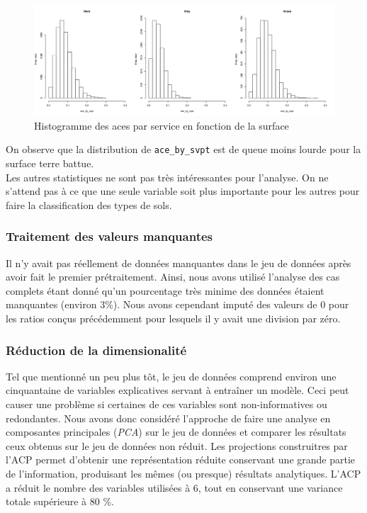 \begin{figure}[H]
	\caption{Histogramme des aces par service en fonction de la surface}
	\label{fig:acebyshist}
	\includegraphics[width=\textwidth]{acebysurfacehist}
\end{figure}

On observe que la distribution de \texttt{ace\_by\_svpt} est de queue moins lourde pour la surface terre battue.\\

Les autres statistiques ne sont pas très intéressantes pour l'analyse. On ne s'attend pas à ce que une seule variable soit plus importante pour les autres pour faire la classification des types de sols.

\subsubsection{Traitement des valeurs manquantes}
Il n'y avait pas réellement de données manquantes dans le jeu de données après avoir fait le premier prétraitement. Ainsi, nous avons utilisé l'analyse des cas complets étant donné qu'un pourcentage très minime des données étaient manquantes (environ 3\%). Nous avons cependant imputé des valeurs de 0 pour les ratios conçus précédemment pour lesquels il y avait une division par zéro.

\subsubsection{Réduction de la dimensionalité}
Tel que mentionné un peu plus tôt, le jeu de données comprend environ une cinquantaine de variables explicatives servant à entraîner un modèle. Ceci peut causer une problème si certaines de ces variables sont non-informatives ou redondantes. Nous avons donc considéré l'approche de faire une analyse en composantes principales (\textit{PCA}) sur le jeu de données et comparer les résultats ceux obtenus sur le jeu de données non réduit. Les projections construitres par l'ACP permet d'obtenir une représentation réduite conservant une grande partie de l'information, produisant les mêmes (ou presque) résultats analytiques. L'ACP a réduit le nombre des variables utilisées à 6, tout en conservant une variance totale supérieure à 80 \%.

